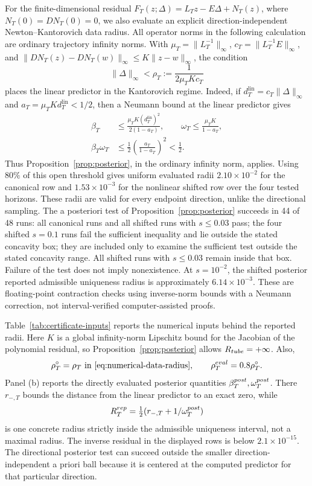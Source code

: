 \documentclass[twocolumn,nameyear,amsthm]{autart}
\newcommand{\lin}{\mathrm{lin}}
\numberwithin{equation}{section}
\begin{document}
For the finite-dimensional residual
$F_T(z;\Delta)=L_Tz-E\Delta+N_T(z)$, where
$N_T(0)=DN_T(0)=0$, we also evaluate an explicit direction-independent
Newton--Kantorovich data radius.  All operator norms in the following
calculation are ordinary trajectory infinity norms.  With
$\mu_T=\|L_T^{-1}\|_\infty$, $c_T=\|L_T^{-1}E\|_\infty$, and
$\|DN_T(z)-DN_T(w)\|_\infty\le K\|z-w\|_\infty$, the condition
\begin{equation}\label{eq:numerical-data-radius}
 \|\Delta\|_\infty<\rho_T:=\frac{1}{2\mu_TKc_T}
\end{equation}
places the linear predictor in the Kantorovich regime.  Indeed, if
$d_T^{\lin}=c_T\|\Delta\|_\infty$ and
$a_T=\mu_TK d_T^{\lin}<1/2$, then a Neumann bound at the
linear predictor gives
\begin{align*}
 \beta_T&\le\frac{\mu_TK(d_T^{\lin})^2}{2(1-a_T)},\qquad
 \omega_T\le\frac{\mu_TK}{1-a_T},\\
 \beta_T\omega_T&\le
 \frac12\left(\frac{a_T}{1-a_T}\right)^2<\frac12 .
\end{align*}
Thus Proposition~\ref{prop:posterior}, in the ordinary infinity norm,
applies.  Using $80\%$ of this
open threshold gives uniform evaluated radii $2.10\times10^{-2}$ for the
canonical row and $1.53\times10^{-3}$ for the nonlinear shifted row over the
four tested horizons.  These radii are valid for every endpoint direction,
unlike the directional
sampling.  The a posteriori test of Proposition~\ref{prop:posterior} succeeds in
44 of 48 runs: all canonical runs and all shifted runs with $s\le0.03$ pass;
the four shifted $s=0.1$ runs fail the sufficient inequality and lie outside
the stated concavity box; they are included only to examine the sufficient
test outside the stated concavity range.  All shifted runs with
$s\le0.03$ remain inside that box.  Failure of the test does not imply
nonexistence.  At $s=10^{-2}$, the shifted posterior
reported admissible uniqueness radius is approximately $6.14\times10^{-3}$.
These are floating-point contraction checks using inverse-norm bounds with a
Neumann correction,
not interval-verified computer-assisted proofs.


Table~\ref{tab:certificate-inputs} reports the numerical inputs behind the
reported radii.  Here $K$ is a global infinity-norm Lipschitz bound for the
Jacobian of the polynomial residual, so Proposition~\ref{prop:posterior}
allows $R_{\rm tube}=+\infty$.  Also,
\[
 \rho_T^\circ=\rho_T\ \text{in \eqref{eq:numerical-data-radius}},\qquad
 \rho_T^{\rm eval}=0.8\rho_T^\circ .
\]
Panel (b) reports the directly evaluated posterior quantities
$\beta_T^{\rm post},\omega_T^{\rm post}$.  There $r_{-,T}$ bounds the
distance from the linear predictor to an exact zero, while
\begin{equation}\label{eq:reported-uniqueness-radius}
 R_T^{\rm rep}=\tfrac12(r_{-,T}+1/\omega_T^{\rm post})
\end{equation}
is one concrete radius strictly inside the admissible uniqueness interval,
not a maximal radius.  The inverse residual in the displayed rows is below
$2.1\times10^{-15}$.  The directional posterior test can succeed outside the
smaller direction-independent a priori ball because it is centered at the computed
predictor for that particular direction.
\end{document}
